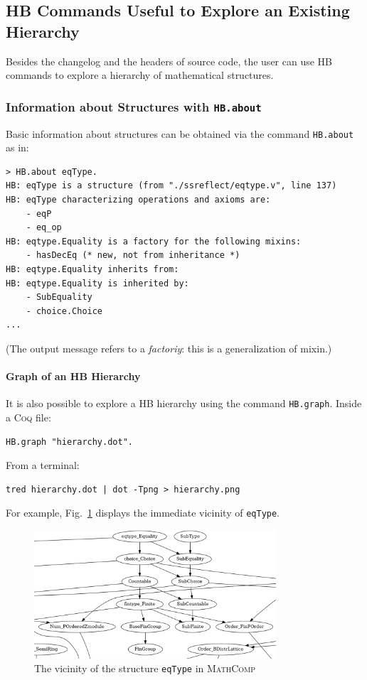 \documentclass{article}
\def\coq{\textsc{Coq}}
\def\mathcomp{\textsc{MathComp}}
\def\hb{\textsc{HB}}
\def\coqin#1{\texttt{#1}}
\def\newterm#1{{\sl #1}}
\begin{document}
\subsection{\hb{} Commands Useful to Explore an Existing Hierarchy}

Besides the changelog and the headers of source code, the user can use
\hb{} commands to explore a hierarchy of mathematical structures.

\subsubsection{Information about Structures with \coqin{HB.about}}
\label{sec:info_structures}

Basic information about structures can be obtained via the command
\coqin{HB.about} as in:
\begin{verbatim}
> HB.about eqType.
HB: eqType is a structure (from "./ssreflect/eqtype.v", line 137)
HB: eqType characterizing operations and axioms are:
    - eqP
    - eq_op
HB: eqtype.Equality is a factory for the following mixins:
    - hasDecEq (* new, not from inheritance *)
HB: eqtype.Equality inherits from:
HB: eqtype.Equality is inherited by:
    - SubEquality
    - choice.Choice
...
\end{verbatim}
(The output message refers to a \newterm{factoriy}: this is a
generalization of mixin.)

\paragraph{Graph of an \hb{} Hierarchy}

It is also possible to explore a \hb{} hierarchy using the command
\coqin{HB.graph}. Inside a \coq{} file:
\begin{verbatim}
HB.graph "hierarchy.dot".
\end{verbatim}
From a terminal:
\begin{verbatim}
tred hierarchy.dot | dot -Tpng > hierarchy.png
\end{verbatim}
For example, Fig.~\ref{fig:eqtype_hier} displays the immediate
vicinity of \coqin{eqType}.

\begin{figure}[htbp]
\centering
\includegraphics[width=9cm]{eqtype_hier.png}
\caption{The vicinity of the structure {\tt eqType} in \mathcomp{}}
\label{fig:eqtype_hier}
\end{figure}
\end{document}
